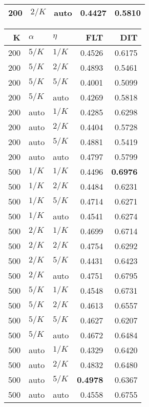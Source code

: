 \begin{table}
\begin{spacing}{1.2}
{\begin{tabular}{rll|rr}
 200 &  $2/K$ &   auto &           0.4427 & 0.5810 \\
\bottomrule
\end{tabular}
} \hfill \parbox{.45\linewidth}{\centering \begin{tabular}{rll|rr}
\toprule
   K &  $\alpha$ &    $\eta$ & FLT &       DIT \\
\midrule
 200 &  $5/K$ &  $1/K$ &           0.4526 &       0.6175 \\
 200 &  $5/K$ &  $2/K$ &           0.4893 &       0.5461 \\
 200 &  $5/K$ &  $5/K$ &           0.4001 &       0.5099 \\
 200 &  $5/K$ &   auto &           0.4269 &       0.5818 \\
 200 &   auto &  $1/K$ &           0.4285 &       0.6298 \\
 200 &   auto &  $2/K$ &           0.4404 &       0.5728 \\
 200 &   auto &  $5/K$ &           0.4881 &       0.5419 \\
 200 &   auto &   auto &           0.4797 &       0.5799 \\
 500 &  $1/K$ &  $1/K$ &           0.4496 & {\bf 0.6976} \\
 500 &  $1/K$ &  $2/K$ &           0.4484 &       0.6231 \\
 500 &  $1/K$ &  $5/K$ &           0.4714 &       0.6271 \\
 500 &  $1/K$ &   auto &           0.4541 &       0.6274 \\
 500 &  $2/K$ &  $1/K$ &           0.4699 &       0.6714 \\
 500 &  $2/K$ &  $2/K$ &           0.4754 &       0.6292 \\
 500 &  $2/K$ &  $5/K$ &           0.4431 &       0.6423 \\
 500 &  $2/K$ &   auto &           0.4751 &       0.6795 \\
 500 &  $5/K$ &  $1/K$ &           0.4548 &       0.6731 \\
 500 &  $5/K$ &  $2/K$ &           0.4613 &       0.6557 \\
 500 &  $5/K$ &  $5/K$ &           0.4627 &       0.6207 \\
 500 &  $5/K$ &   auto &           0.4672 &       0.6484 \\
 500 &   auto &  $1/K$ &           0.4329 &       0.6420 \\
 500 &   auto &  $2/K$ &           0.4832 &       0.6480 \\
 500 &   auto &  $5/K$ &     {\bf 0.4978} &       0.6367 \\
 500 &   auto &   auto &           0.4558 &       0.6755 \\
\bottomrule
\end{tabular}
}
\end{spacing}
\end{table}

